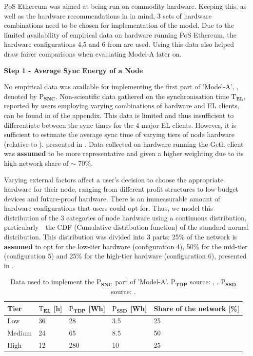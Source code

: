 PoS Ethereum was aimed at being run on commodity hardware. Keeping this, as well as the hardware recommendations in  in mind, 3 sets of hardware combinations need to be chosen for implementation of the model. Due to the limited availability of empirical data on hardware running PoS Ethereum, the hardware configurations 4,5 and 6 from  are used. Using this data also helped draw fairer comparisons when evaluating Model-A later on. 

\textbf{Step 1 - Average Sync Energy of a Node}

No empirical data was available for implementing the first part of 'Model-A', , denoted by $\boldsymbol{\mathrm{P}_{SNC}}$. Non-scientific data gathered on the synchronisation time $\boldsymbol{\mathrm{T}_{EL}}$, reported by users employing varying combinations of hardware and EL clients, can be found in  of the appendix. This data is limited and thus insufficient to differentiate between the sync times for the 4 major EL clients. However, it is sufficient to estimate the average sync time of varying tiers of node hardware (relative to ), presented in . Data collected on hardware running the Geth client was \textbf{assumed} to be more representative and given a higher weighting due to its high network share of $\sim$ 70\%. 

Varying external factors affect a user's decision to choose the appropriate hardware for their node, ranging from different profit structures to low-budget devices and future-proof hardware. There is an immeasurable amount of hardware configurations that users could opt for. Thus, we model this distribution of the 3 categories of node hardware using a continuous distribution, particularly - the CDF (Cumulative distribution function) of the standard normal distribution. This distribution was divided into 3 parts; 25\% of the network is \textbf{assumed} to opt for the low-tier hardware (configuration 4), 50\% for the mid-tier (configuration 5) and 25\% for the high-tier hardware (configuration 6), presented in . 

\begin{table}[h]
\centering
\begin{tabular}{|l|l|l|l|l|}
\hline
\textbf{Tier} & \textbf{$\boldsymbol{\mathrm{T}_{EL}}$ {[}h{]}} & \textbf{$\boldsymbol{\mathrm{P}_{TDP}}$ {[}Wh{]}} & \textbf{$\boldsymbol{\mathrm{P}_{SSD}}$ {[}Wh{]}} & \textbf{Share of the network {[}\%{]}} \\ \hline
Low    & 36 & 28  & 3.5 & 25 \\ \hline
Medium & 24 & 65  & 8.5 & 50 \\ \hline
High   & 12 & 280 & 10  & 25 \\ \hline
\end{tabular}
\caption{Data used to implement the  $\boldsymbol{\mathrm{P}_{SNC}}$ part of 'Model-A'.  $\boldsymbol{\mathrm{P}_{TDP}}$ source: \cite{IntelFAQs}, \cite{AMDDatabase}. $\boldsymbol{\mathrm{P}_{SSD}}$ source: \cite{RachanaKhamamkar2020AnalyzingDrives}.}
\label{Table:SyncEnergy}
\end{table} 

